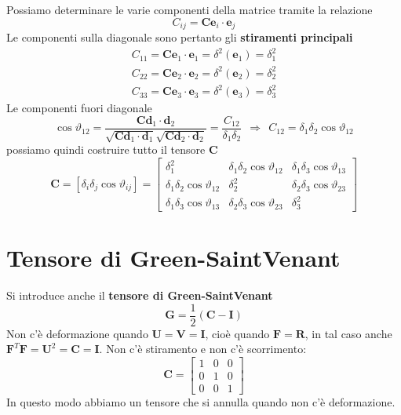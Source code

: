 \documentclass[10pt,a4paper,twoside]{book}
\begin{document}
Possiamo determinare le varie componenti della matrice tramite la relazione
\begin{equation*}
C_{ij} =\mathbf{Ce}_{i} \cdotp \mathbf{e}_{j}
\end{equation*}
Le componenti sulla diagonale sono pertanto gli \textbf{stiramenti principali}
\begin{gather*}
C_{11} =\mathbf{Ce}_{1} \cdotp \mathbf{e}_{1} =\delta ^{2}(\mathbf{e}_{1}) =\delta ^{2}_{1}\\
C_{22} =\mathbf{Ce}_{2} \cdotp \mathbf{e}_{2} =\delta ^{2}(\mathbf{e}_{2}) =\delta ^{2}_{2}\\
C_{33} =\mathbf{Ce}_{3} \cdotp \mathbf{e}_{3} =\delta ^{2}(\mathbf{e}_{3}) =\delta ^{2}_{3}
\end{gather*}
Le componenti fuori diagonale
\begin{equation*}
\cos \vartheta _{12} =\frac{\mathbf{Cd}_{1} \cdotp \mathbf{d}_{2}}{\sqrt{\mathbf{Cd}_{1} \cdotp \mathbf{d}_{1}}\sqrt{\mathbf{Cd}_{2} \cdotp \mathbf{d}_{2}}} =\frac{C_{12}}{\delta _{1} \delta _{2}} \ \ \Rightarrow \ \ C_{12} =\delta _{1} \delta _{2}\cos \vartheta _{12}
\end{equation*}
possiamo quindi costruire tutto il tensore $\mathbf{C}$
\begin{equation*}
\mathbf{C} =[ \delta _{i} \delta _{j}\cos \vartheta _{ij}] =\begin{bmatrix}
\delta ^{2}_{1} & \delta _{1} \delta _{2}\cos \vartheta _{12} & \delta _{1} \delta _{3}\cos \vartheta _{13}\\
\delta _{1} \delta _{2}\cos \vartheta _{12} & \delta ^{2}_{2} & \delta _{2} \delta _{3}\cos \vartheta _{23}\\
\delta _{1} \delta _{3}\cos \vartheta _{13} & \delta _{2} \delta _{3}\cos \vartheta _{23} & \delta ^{2}_{3}
\end{bmatrix}
\end{equation*}
\section{Tensore di Green-SaintVenant}

Si introduce anche il \textbf{tensore di Green-SaintVenant}
\begin{equation*}
\boxed{\mathbf{G} =\frac{1}{2}(\mathbf{C} -\mathbf{I})}
\end{equation*}
Non c'è deformazione quando $\mathbf{U} =\mathbf{V} =\mathbf{I}$, cioè quando $\mathbf{F} =\mathbf{R}$, in tal caso anche $\mathbf{F}^{T}\mathbf{F} =\mathbf{U}^{2} =\mathbf{C} =\mathbf{I}$. Non c'è stiramento e non c'è scorrimento:
\begin{equation*}
\mathbf{C} =\begin{bmatrix}
1 & 0 & 0\\
0 & 1 & 0\\
0 & 0 & 1
\end{bmatrix}
\end{equation*}
In questo modo abbiamo un tensore che si annulla quando non c'è deformazione.
\end{document}
